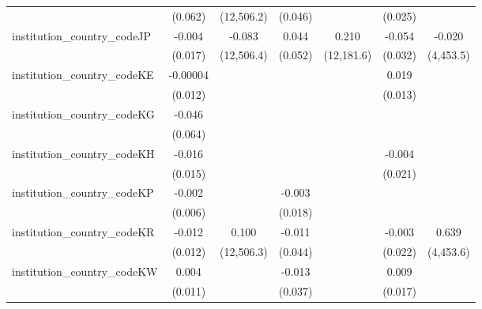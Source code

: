 \begin{tabular}{lcccccc}
                                         & (0.062)        & (12,506.2)    & (0.046)       &               & (0.025)       &   \\   
   institution\_country\_codeJP          & -0.004         & -0.083        & 0.044         & 0.210         & -0.054        & -0.020\\   
                                         & (0.017)        & (12,506.4)    & (0.052)       & (12,181.6)    & (0.032)       & (4,453.5)\\   
   institution\_country\_codeKE          & -0.00004       &               &               &               & 0.019         &   \\   
                                         & (0.012)        &               &               &               & (0.013)       &   \\   
   institution\_country\_codeKG          & -0.046         &               &               &               &               &   \\   
                                         & (0.064)        &               &               &               &               &   \\   
   institution\_country\_codeKH          & -0.016         &               &               &               & -0.004        &   \\   
                                         & (0.015)        &               &               &               & (0.021)       &   \\   
   institution\_country\_codeKP          & -0.002         &               & -0.003        &               &               &   \\   
                                         & (0.006)        &               & (0.018)       &               &               &   \\   
   institution\_country\_codeKR          & -0.012         & 0.100         & -0.011        &               & -0.003        & 0.639\\   
                                         & (0.012)        & (12,506.3)    & (0.044)       &               & (0.022)       & (4,453.6)\\   
   institution\_country\_codeKW          & 0.004          &               & -0.013        &               & 0.009         &   \\   
                                         & (0.011)        &               & (0.037)       &               & (0.017)       &   \\   

\end{tabular}
